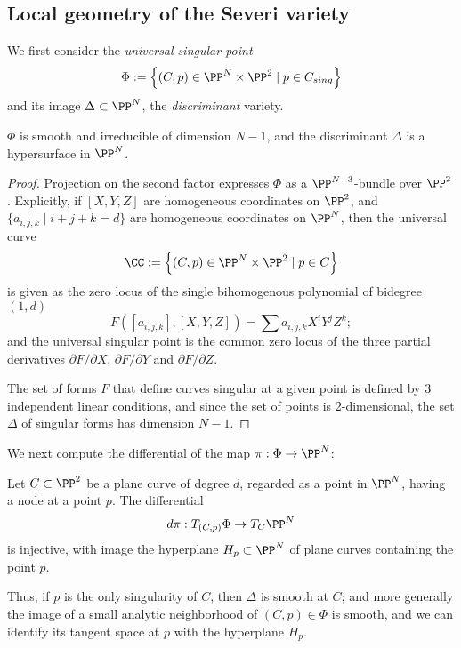 
\subsection{Local geometry of the Severi variety}\label{local severi geometry}

We first consider the \emph{universal singular point}
$$
\Phi := \left\{ (C, p) \in \PP^N \times \PP^2 \mid p \in C_{sing} \right\}
$$
and its image $\Delta\subset \PP^N$, the \emph{discriminant} variety. 

\begin{proposition}
 $\Phi$ is smooth and irreducible of dimension $N-1$, and the discriminant $\Delta$ is a hypersurface in $\PP^N$.
\end{proposition}
\begin{proof}
Projection on the second factor expresses $\Phi$ as a $\PP^{N-3}$-bundle over $\PP^2$. Explicitly, if $[X,Y,Z]$ are homogeneous coordinates on $\PP^2$, and $\{a_{i,j,k} \mid i+j+k = d \}$ are homogeneous coordinates on $\PP^N$, then the universal curve 
$$
\CC := \left\{ (C, p) \in \PP^N \times \PP^2 \mid p \in C \right\}
$$
is given as the zero locus of the single bihomogenous polynomial of bidegree $(1, d)$
$$
F([a_{i,j,k}], [X,Y,Z] ) = \sum a_{i,j,k} X^iY^jZ^k;
$$
and the universal singular point is the common zero locus of the three partial derivatives $\partial F/\partial X$, $\partial F/\partial Y$ and  $\partial F/\partial Z$. 

The set of forms $F$ that define curves singular at a given point is defined by 3 independent linear conditions, and since the set of 
points is 2-dimensional, the set $\Delta$ of singular forms has dimension $N-1$.
\end{proof}
 
We next compute the differential of the map $\pi : \Phi \to \PP^N$:

\begin{lemma}\label{tangent space to discriminant}
Let $C \subset \PP^2$ be a plane curve of degree $d$, regarded as a point in $\PP^N$,  having a node at a point $p$. The differential 
$$
d\pi : T_{(C,p)}\Phi \to T_C \PP^N
$$
is injective, with image the hyperplane $H_p \subset \PP^N$ of plane curves containing the point $p$.
\end{lemma}

Thus, if $p$ is the only singularity of $C$, then $\Delta$ is smooth at $C$; and more generally the image of a small analytic neighborhood of $(C,p) \in \Phi$ is smooth, and we can identify its tangent space at $p$ with the hyperplane $H_p$. 

